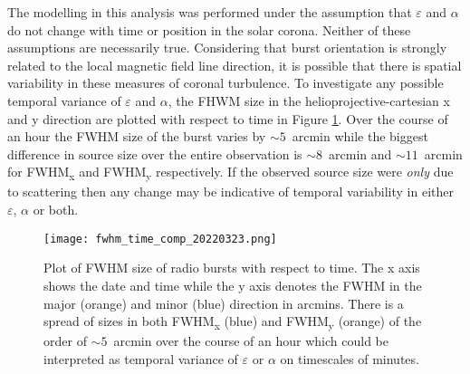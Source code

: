 
The modelling in this analysis was performed under the assumption that $\varepsilon$ and $\alpha$ do not change with time or position in the solar corona. Neither of these assumptions are necessarily true. Considering that burst orientation is strongly related to the local magnetic field line direction, it is possible that there is spatial variability in these measures of coronal turbulence. To investigate any possible temporal variance of $\varepsilon$ and $\alpha$, the FHWM size in the helioprojective-cartesian x and y direction are plotted with respect to time in Figure \ref{fig:fwhm_time_comp}. Over the course of an hour the FWHM size of the burst varies by $\sim 5$~arcmin while the biggest difference in source size over the entire observation is $\sim 8$~arcmin and $\sim 11$~arcmin for FWHM\textsubscript{x} and FWHM\textsubscript{y} respectively. If the observed source size were \textit{only} due to scattering then any change may be indicative of temporal variability in either $\varepsilon$, $\alpha$ or both.

\begin{figure}
\centering
\texttt{[image: fwhm\_time\_comp\_20220323.png]}
\caption[Plot of FWHM size of radio bursts with respect to time.]{Plot of FWHM size of radio bursts with respect to time. The x axis shows the date and time while the y axis denotes the FWHM in the major  (orange) and minor (blue) direction in arcmins. There is a spread of sizes in both FWHM\textsubscript{x} (blue) and FWHM\textsubscript{y} (orange) of the order of $\sim 5$~arcmin over the course of an hour which could be interpreted as temporal variance of $\varepsilon$ or $\alpha$ on timescales of minutes.}
\label{fig:fwhm_time_comp}
\end{figure}


